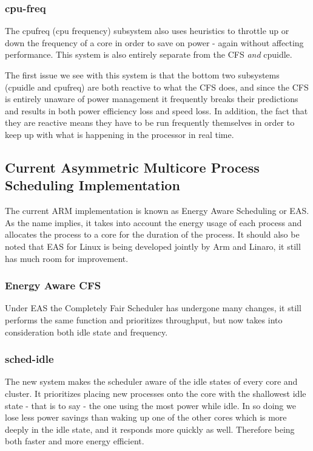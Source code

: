 \subsubsection{cpu-freq}
The cpufreq (cpu frequency) subsystem also uses heuristics to throttle up or down the frequency of a core in order to save on power - again without affecting performance. This system is also entirely separate from the CFS \textit{and} cpuidle. \cite{EAS2015}

The first issue we see with this system is that the bottom two subsystems (cpuidle and cpufreq) are both reactive to what the CFS does, and since the CFS is entirely unaware of power management it frequently breaks their predictions and results in both power efficiency loss and speed loss. In addition, the fact that they are reactive means they have to be run frequently themselves in order to keep up with what is happening in the processor in real time. \cite{EAS2015}

\subsection{Current Asymmetric Multicore Process Scheduling Implementation}
The current ARM implementation is known as Energy Aware Scheduling or EAS. As the name implies, it takes into account the energy usage of each process and allocates the process to a core for the duration of the process. It should also be noted that EAS for Linux is being developed jointly by Arm and Linaro, it still has much room for improvement.\cite{EASp2015}

\subsubsection{Energy Aware CFS}
Under EAS the Completely Fair Scheduler has undergone many changes, it still performs the same function and prioritizes throughput, but now takes into consideration both idle state and frequency. \cite{EASp2015}

\subsubsection{sched-idle}
The new system makes the scheduler aware of the idle states of every core and cluster. It prioritizes placing new processes onto the core with the shallowest idle state - that is to say - the one using the most power while idle. In so doing we lose less power savings than waking up one of the other cores which is more deeply in the idle state, and it responds more quickly as well. Therefore being both faster and more energy efficient. \cite{EASp2015}

